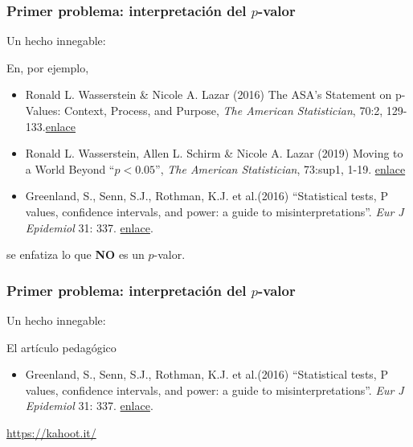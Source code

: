 \documentclass[9pt]{beamer}
\begin{document}
\begin{frame}
  \frametitle{Primer problema: interpretación del $p$-valor}
    \begin{overlayarea}{\textwidth}{0.8\textheight}
  Un hecho innegable:\medskip \onslide<+->

  \begin{center}
  \end{center}\medskip

En, por ejemplo,
\begin{itemize}
\item Ronald L. Wasserstein \& Nicole A. Lazar (2016) The ASA's
  Statement on p-Values: Context, Process, and Purpose, \textit{The
    American Statistician}, 70:2, 129-133.\href{https://doi.org/10.1080/00031305.2016.1154108}{enlace}
\item Ronald L. Wasserstein, Allen L. Schirm \& Nicole A. Lazar (2019)
  Moving to a World Beyond ``$p < 0.05$'', \textit{The American
    Statistician}, 73:sup1, 1-19. \href{https://doi.org/10.1080/00031305.2019.1583913}{enlace}
\item Greenland, S., Senn, S.J., Rothman, K.J. et al.(2016)  ``Statistical tests, P values, confidence intervals, and power: a guide to misinterpretations''. \textit{Eur J Epidemiol}  31: 337. \href{https://doi.org/10.1007/s10654-016-0149-3}{enlace}.
\end{itemize}
se enfatiza lo que \textbf{NO} es un $p$-valor.
\end{overlayarea}
\end{frame}

\begin{frame}
  \frametitle{Primer problema: interpretación del $p$-valor}
    \begin{overlayarea}{\textwidth}{0.8\textheight}
  Un hecho innegable:\medskip \onslide<+->

  \begin{center}
  \end{center}\medskip

  El artículo pedagógico
  \begin{itemize}
  \item  Greenland, S., Senn, S.J., Rothman, K.J. et al.(2016)  ``Statistical tests, P values, confidence intervals, and power: a guide to misinterpretations''. \textit{Eur J Epidemiol}  31: 337. \href{https://doi.org/10.1007/s10654-016-0149-3}{enlace}.
\end{itemize}\bigskip \onslide<+->
 \begin{center}
   \Huge \href{https://tinyurl.com/y2g9ppjh}{https://kahoot.it/}
 \end{center}

\end{overlayarea}
\end{frame}
\end{document}
